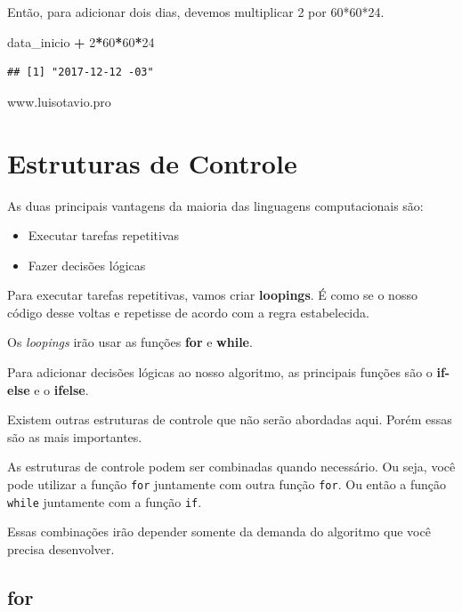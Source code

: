 \documentclass[
]{book}
\newenvironment{Shaded}{\begin{snugshade}}{\end{snugshade}}
\newcommand{\DecValTok}[1]{\textcolor[rgb]{0.00,0.00,0.81}{#1}}
\newcommand{\NormalTok}[1]{#1}
\newcommand{\OperatorTok}[1]{\textcolor[rgb]{0.81,0.36,0.00}{\textbf{#1}}}
\newcommand{\StringTok}[1]{\textcolor[rgb]{0.31,0.60,0.02}{#1}}
\providecommand{\tightlist}{%
  \setlength{\itemsep}{0pt}\setlength{\parskip}{0pt}}
\begin{document}
Então, para adicionar dois dias, devemos multiplicar 2 por 60*60*24.

\begin{Shaded}
\begin{Highlighting}[]
\NormalTok{data_inicio }\OperatorTok{+}\StringTok{ }\DecValTok{2}\OperatorTok{*}\DecValTok{60}\OperatorTok{*}\DecValTok{60}\OperatorTok{*}\DecValTok{24}
\end{Highlighting}
\end{Shaded}

\begin{verbatim}
## [1] "2017-12-12 -03"
\end{verbatim}

www.luisotavio.pro

\hypertarget{estruturas-de-controle}{%
\chapter{Estruturas de Controle}\label{estruturas-de-controle}}

As duas principais vantagens da maioria das linguagens computacionais
são:

\begin{itemize}
\tightlist
\item
  Executar tarefas repetitivas
\item
  Fazer decisões lógicas
\end{itemize}

Para executar tarefas repetitivas, vamos criar \textbf{loopings}. É como
se o nosso código desse voltas e repetisse de acordo com a regra
estabelecida.

Os \emph{loopings} irão usar as funções \textbf{for} e \textbf{while}.

Para adicionar decisões lógicas ao nosso algoritmo, as principais
funções são o \textbf{if-else} e o \textbf{ifelse}.

Existem outras estruturas de controle que não serão abordadas aqui.
Porém essas são as mais importantes.

As estruturas de controle podem ser combinadas quando necessário. Ou
seja, você pode utilizar a função \texttt{for} juntamente com outra
função \texttt{for}. Ou então a função \texttt{while} juntamente com a
função \texttt{if}.

Essas combinações irão depender somente da demanda do algoritmo que você
precisa desenvolver.

\hypertarget{for}{%
\section{for}\label{for}}
\end{document}
